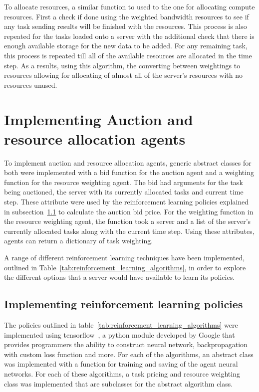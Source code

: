 To allocate resources, a similar function to used to the one for allocating compute resources. First a check if done
using the weighted bandwidth resources to see if any task sending results will be finished with the resources.
This process is also repeated for the tasks loaded onto a server with the additional check that there is enough
available storage for the new data to be added. For any remaining task, this process is repeated till all of the
available resources are allocated in the time step. As a results, using this algorithm, the converting between
weightings to resources allowing for allocating of almost all of the server's resources with no resources unused.

\section{Implementing Auction and resource allocation agents}\label{sec:implementing-auction-and-resource-allocation-agents}
To implement auction and resource allocation agents, generic abstract classes for both were implemented with a bid
function for the auction agent and a weighting function for the resource weighting agent. The bid had arguments for the
task being auctioned, the server with its currently allocated tasks and current time step. These attribute were used by
the reinforcement learning policies explained in subsection~\ref{subsec:implementing-auction-and-resource-allocation-agents}
to calculate the auction bid price. For the weighting function in the resource weighting agent, the function took a
server and a list of the server's currently allocated tasks along with the current time step. Using these attributes,
agents can return a dictionary of task weighting.

A range of different reinforcement learning techniques have been implemented, outlined in
Table~\ref{tab:reinforcement_learning_algorithms}, in order to explore the different options that a server would have
available to learn its policies.

\subsection{Implementing reinforcement learning policies}\label{subsec:implementing-auction-and-resource-allocation-agents}
The policies outlined in table~\ref{tab:reinforcement_learning_algorithms} were implemented using
tensorflow~\citep{tensorflow2015-whitepaper}, a python module developed by Google
that provides programmers the ability to construct neural network, backpropagation with custom loss function and more.
For each of the algorithms, an abstract class was implemented with a function for training and saving of the agent
neural networks. For each of these algorithms, a task pricing and resource weighting class was implemented that are
subclasses for the abstract algorithm class.

